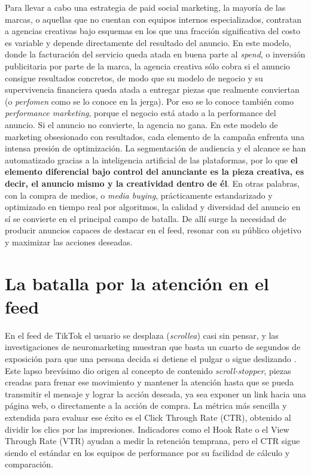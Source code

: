 \documentclass[12pt, a4paper]{report}
\begin{document}
Para llevar a cabo una estrategia de paid social marketing, la mayoría de las
marcas, o aquellas que no cuentan con equipos internos especializados, contratan a
agencias creativas bajo esquemas en los que una fracción significativa del costo es
variable y depende directamente del resultado del anuncio. En este modelo, donde
la facturación del servicio queda atada en buena parte al \textit{spend}, o inversión
publicitaria por parte de la marca, la agencia creativa sólo cobra si el anuncio
consigue resultados concretos, de modo que su modelo de negocio y su
supervivencia financiera queda atada a entregar piezas que realmente conviertan
(o \textit{perfomen} como se lo conoce en la jerga). Por eso se lo conoce también como
\textit{performance marketing}, porque el negocio está atado a la performance del anuncio.
Si el anuncio no convierte, la agencia no gana. En este modelo de marketing
obsesionado con resultados, cada elemento de la campaña enfrenta una intensa
presión de optimización. La segmentación de audiencia y el alcance se han
automatizado gracias a la inteligencia artificial de las plataformas, por lo que
\textbf{el elemento diferencial bajo control del anunciante es la pieza creativa, es decir,
el anuncio mismo y la creatividad dentro de él}. En otras palabras, con la compra
de medios, o \textit{media buying}, prácticamente estandarizado y optimizado en tiempo
real por algoritmos, la calidad y diversidad del anuncio en sí se convierte en el
principal campo de batalla. De allí surge la necesidad de producir anuncios capaces
de destacar en el feed, resonar con su público objetivo y maximizar las acciones
deseadas.

\section{La batalla por la atención en el feed}

En el feed de TikTok el usuario se desplaza (\textit{scrollea}) casi sin pensar,
y las investigaciones de neuromarketing muestran que basta un cuarto de segundos de
exposición para que una persona decida si detiene el pulgar o sigue deslizando
\citep{metafeed2016}. Este lapso brevísimo dio origen al concepto de contenido
\textit{scroll-stopper}, piezas creadas para frenar ese movimiento y mantener la atención
hasta que se pueda transmitir el mensaje y lograr la acción deseada, ya sea exponer un
link hacia una página web, o directamente a la acción de compra. La métrica más sencilla
y extendida para evaluar ese éxito es el Click Through Rate (CTR), obtenido al dividir los
clics por las impresiones. Indicadores como el Hook Rate o el View Through Rate (VTR)
ayudan a medir la retención temprana, pero el CTR sigue siendo el estándar en los equipos
de performance por su facilidad de cálculo y comparación.
\end{document}
